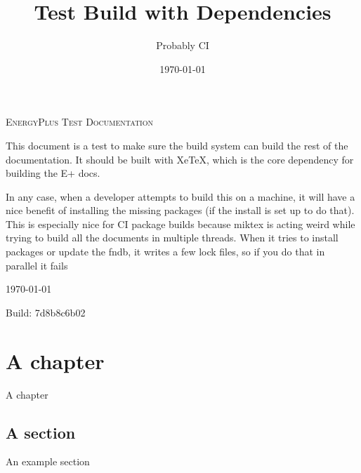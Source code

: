 

\title{Test Build with Dependencies}
\author{Probably CI}
\date{\today}




\makeatletter
\begin{titlepage}
  \begin{center}
    {\scshape\LARGE EnergyPlus\texttrademark{} Test Documentation \par}
    \vspace{1.5cm}
    {\bfseries\huge \@title \par}
    \vspace{1.5cm}
    {\Large\itshape \@author \par}
    \vspace{2.5cm}

    This document is a test to make sure the build system can build the rest of the documentation.
    It should be built with XeTeX, which is the core dependency for building the E+ docs.

    In any case, when a developer attempts to build this on a machine, it will have a nice benefit of installing the missing packages (if the install is set up to do that).
    This is especially nice for CI package builds because miktex is acting weird while trying to build all the documents in multiple threads.
    When it tries to install packages or update the fndb, it writes a few lock files, so if you do that in parallel it fails
    \vfill


    {\large \today \par}
    \vspace{1.5cm}
    {\large Build: 7d8b8c6b02 \par}
  \end{center}
  {\small
  }
\end{titlepage}
\makeatother

{
\setcounter{tocdepth}{2}
\tableofcontents
}

\hypertarget{generated-toc}{}

\chapter{A chapter}\label{chapter-1}

A chapter

\section{A section}\label{chapter-1-section-1}

An example section


